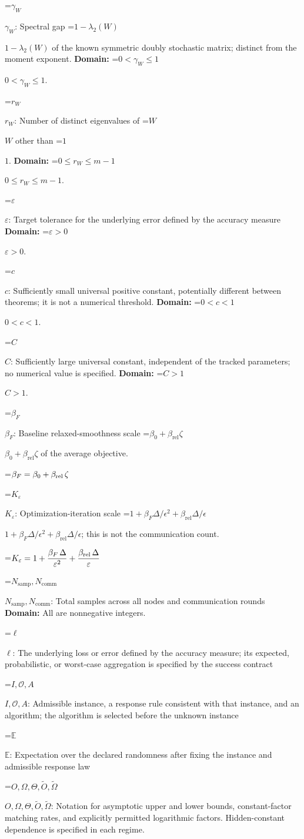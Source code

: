 \documentclass[10pt,a4paper]{article}
\newcommand{\AtlasMath}[1]{\par\begingroup\centering\setbox0=\hbox{$\displaystyle #1$}\ifdim\wd0>1.4\linewidth\typeout{ATLAS WIDE FORMULA: \the\wd0}\fi\ifdim\wd0>\linewidth\resizebox{\linewidth}{!}{\box0}\else\box0\fi\par\endgroup}
\newcommand{\AtlasInlineMath}[1]{\begingroup\setbox0=\hbox{$#1$}\ifdim\wd0>.4\linewidth\endgroup\AtlasMath{#1}\else\endgroup$#1$\fi}
\begin{document}
\AtlasInlineMath{\gamma_W}: Spectral gap \AtlasInlineMath{1-\lambda_2(W)} of the known symmetric doubly stochastic matrix; distinct from the moment exponent. \textbf{Domain:} \AtlasInlineMath{0<\gamma_W\le1}.

\AtlasInlineMath{r_W}: Number of distinct eigenvalues of \AtlasInlineMath{W} other than \AtlasInlineMath{1}. \textbf{Domain:} \AtlasInlineMath{0\le r_W\le m-1}.

\AtlasInlineMath{\varepsilon}: Target tolerance for the underlying error defined by the accuracy measure \textbf{Domain:} \AtlasInlineMath{\varepsilon>0}.

\AtlasInlineMath{c}: Sufficiently small universal positive constant, potentially different between theorems; it is not a numerical threshold. \textbf{Domain:} \AtlasInlineMath{0<c<1}.

\AtlasInlineMath{C}: Sufficiently large universal constant, independent of the tracked parameters; no numerical value is specified. \textbf{Domain:} \AtlasInlineMath{C>1}.

\AtlasInlineMath{\beta_F}: Baseline relaxed-smoothness scale \AtlasInlineMath{\beta_0+\beta_{\mathrm{rel}}\zeta} of the average objective.


\AtlasMath{\beta_F=\beta_0+\beta_{\rm rel}\,\zeta}


\AtlasInlineMath{K_\varepsilon}: Optimization-iteration scale \AtlasInlineMath{1+\beta_F\Delta/\epsilon^2+\beta_{\mathrm{rel}}\Delta/\epsilon}; this is not the communication count.


\AtlasMath{K_\varepsilon=1+\frac{\beta_F\,\Delta}{{\varepsilon}^{2}}+\frac{\beta_{\rm rel}\,\Delta}{\varepsilon}}


\AtlasInlineMath{N_{\mathrm{samp}},N_{\mathrm{comm}}}: Total samples across all nodes and communication rounds \textbf{Domain:} All are nonnegative integers.

\AtlasInlineMath{\ell}: The underlying loss or error defined by the accuracy measure; its expected, probabilistic, or worst-case aggregation is specified by the success contract

\AtlasInlineMath{I,\mathcal{O},A}: Admissible instance, a response rule consistent with that instance, and an algorithm; the algorithm is selected before the unknown instance

\AtlasInlineMath{\mathbb{E}}: Expectation over the declared randomness after fixing the instance and admissible response law

\AtlasInlineMath{O,\Omega,\Theta,\widetilde{O},\widetilde\Omega}: Notation for asymptotic upper and lower bounds, constant-factor matching rates, and explicitly permitted logarithmic factors. Hidden-constant dependence is specified in each regime.
\end{document}
